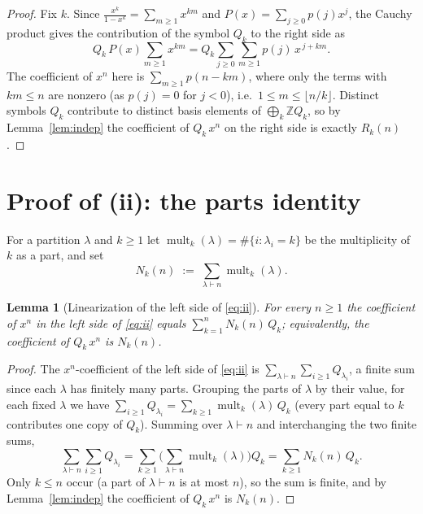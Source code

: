 \documentclass[12pt]{article}
\newtheorem{lemma}{Lemma}
\theoremstyle{definition}
\DeclareMathOperator{\mult}{mult}
\begin{document}
\begin{proof}
Fix $k$. Since $\frac{x^k}{1-x^k}=\sum_{m\ge1}x^{km}$ and $P(x)=\sum_{j\ge0}p(j)x^j$,
the Cauchy product gives the contribution of the symbol $Q_k$ to the right side as
\[
Q_k\,P(x)\sum_{m\ge1}x^{km}
=Q_k\sum_{j\ge0}\sum_{m\ge1}p(j)\,x^{\,j+km}.
\]
The coefficient of $x^n$ here is $\sum_{m\ge1}p(n-km)$, where only the terms with
$km\le n$ are nonzero (as $p(j)=0$ for $j<0$), i.e.\ $1\le m\le\lfloor n/k\rfloor$.
Distinct symbols $Q_k$ contribute to distinct basis elements of
$\bigoplus_k\mathbb Z Q_k$, so by Lemma~\ref{lem:indep} the coefficient of
$Q_k\,x^n$ on the right side is exactly $R_k(n)$.
\end{proof}

\section{Proof of (ii): the parts identity}

For a partition $\lambda$ and $k\ge1$ let $\mult_k(\lambda)=\#\{i:\lambda_i=k\}$ be
the multiplicity of $k$ as a part, and set
\begin{equation}\label{eq:Nk}
N_k(n)\;:=\;\sum_{\lambda\vdash n}\mult_k(\lambda).
\end{equation}

\begin{lemma}[Linearization of the left side of \eqref{eq:ii}]\label{lem:linII}
For every $n\ge1$ the coefficient of $x^n$ in the left side of \eqref{eq:ii} equals
$\sum_{k=1}^{n} N_k(n)\,Q_k$; equivalently, the coefficient of $Q_k\,x^n$ is
$N_k(n)$.
\end{lemma}

\begin{proof}
The $x^n$-coefficient of the left side of \eqref{eq:ii} is
$\sum_{\lambda\vdash n}\sum_{i\ge1}Q_{\lambda_i}$, a finite sum since each $\lambda$
has finitely many parts. Grouping the parts of $\lambda$ by their value, for each
fixed $\lambda$ we have $\sum_{i\ge1}Q_{\lambda_i}=\sum_{k\ge1}\mult_k(\lambda)\,Q_k$
(every part equal to $k$ contributes one copy of $Q_k$). Summing over
$\lambda\vdash n$ and interchanging the two finite sums,
\[
\sum_{\lambda\vdash n}\sum_{i\ge1}Q_{\lambda_i}
=\sum_{k\ge1}\Big(\sum_{\lambda\vdash n}\mult_k(\lambda)\Big)Q_k
=\sum_{k\ge1}N_k(n)\,Q_k.
\]
Only $k\le n$ occur (a part of $\lambda\vdash n$ is at most $n$), so the sum is
finite, and by Lemma~\ref{lem:indep} the coefficient of $Q_k\,x^n$ is $N_k(n)$.
\end{proof}
\end{document}

